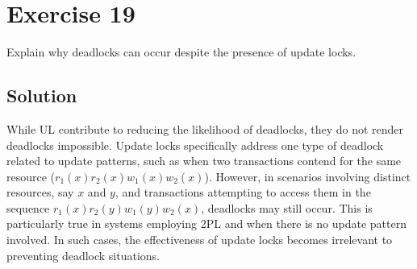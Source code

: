 \section{Exercise 19}

Explain why deadlocks can occur despite the presence of update locks. 

\subsection*{Solution}
While UL contribute to reducing the likelihood of deadlocks, they do not render deadlocks impossible.
Update locks specifically address one type of deadlock related to update patterns, such as when two transactions contend for the same resource ($r_1(x) r_2(x) w_1(x) w_2(x)$). 
However, in scenarios involving distinct resources, say $x$ and $y$, and transactions attempting to access them in the sequence $r_1(x) r_2(y) w_1(y) w_2(x)$, deadlocks may still occur.
This is particularly true in systems employing 2PL and when there is no update pattern involved.
In such cases, the effectiveness of update locks becomes irrelevant to preventing deadlock situations.